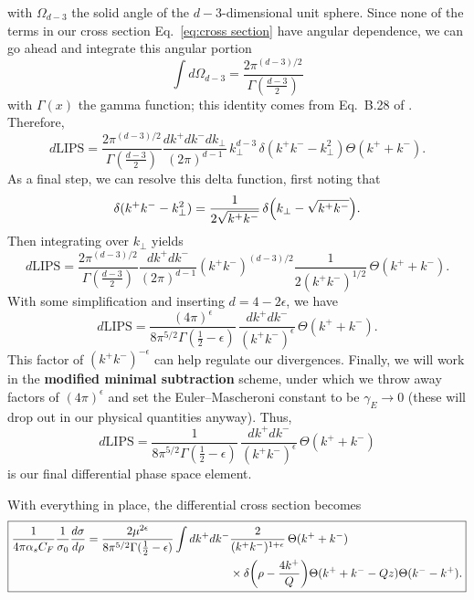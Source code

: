 \documentclass[11pt,twoside,reqno]{amsart}
\theoremstyle{plain}
\theoremstyle{remark}
\theoremstyle{definition}
\theoremstyle{remark}
\theoremstyle{definition}
\theoremstyle{definition}
\newcommand{\LIPS}{\mathrm{LIPS}}
\begin{document}
	with $\Omega_{d - 3}$ the solid angle of the $d - 3$-dimensional unit sphere. Since none of the terms in our cross section Eq.\ \ref{eq:cross section} have angular dependence, we can go ahead and integrate this angular portion
	\begin{equation}
		\int d\Omega_{d - 3} = \frac{2\pi^{(d - 3)/2}}{\Gamma(\frac{d - 3}{2})}
	\end{equation}
	with $\Gamma(x)$ the gamma function; this identity comes from Eq.\ B.28 of \cite{schwartz_quantum_2014}. Therefore,
	\begin{equation}
		d\LIPS = \frac{2\pi^{(d - 3)/2}}{\Gamma(\frac{d - 3}{2})} \frac{dk^+ dk^- dk_\perp}{(2 \pi)^{d - 1}}\,k_\perp^{d - 3}\, \delta(k^+ k^- - k_\perp^2) \Theta(k^+ + k^-).
	\end{equation}
	As a final step, we can resolve this delta function, first noting that
	\begin{equation}
		\delta(k^+ k^- - k_\perp^2) = \frac{1}{2\sqrt{k^+ k^-}}\,\delta\qty(k_\perp - \sqrt{k^+ k^-}).
	\end{equation}
	Then integrating over $k_\perp$ yields
	\begin{equation}
		d\LIPS = \frac{2\pi^{(d - 3)/2}}{\Gamma(\frac{d - 3}{2})} \frac{dk^+ dk^-}{(2 \pi)^{d - 1}} (k^+ k^-)^{(d - 3)/2}\frac{1}{2(k^+ k^-)^{1/2}}\,\Theta(k^+ + k^-).
	\end{equation}
	With some simplification and inserting $d = 4 - 2\epsilon$, we have
	\begin{equation}
		d\LIPS = \frac{(4\pi)^\epsilon}{8\pi^{5/2}\Gamma(\frac{1}{2} - \epsilon)}\,\frac{dk^+ dk^-}{(k^+ k^-)^\epsilon} \, \Theta(k^+ + k^-).
	\end{equation}
	This factor of $(k^+ k^-)^{-\epsilon}$ can help regulate our divergences. Finally, we will work in the \textbf{modified minimal subtraction} scheme, under which we throw away factors of $(4\pi)^\epsilon$ and set the Euler–Mascheroni constant to be $\gamma_E \to 0$ (these will drop out in our physical quantities anyway). Thus,
	\begin{equation}
		d\LIPS = \frac{1}{8\pi^{5/2}\Gamma(\frac{1}{2} - \epsilon)}\,\frac{dk^+ dk^-}{(k^+ k^-)^\epsilon} \, \Theta(k^+ + k^-)
	\end{equation}
	is our final differential phase space element.

	With everything in place, the differential cross section becomes
	\begin{equation}
	\boxed{
	\begin{aligned}
		\frac{1}{4\pi \alpha_s C_F}\frac{1}{\sigma_0} \frac{d\sigma}{d\rho} = \frac{2\mu^{2\epsilon}}{8\pi^{5/2}\Gamma(\frac{1}{2} - \epsilon)} \int dk^+ dk^- & \frac{2}{(k^+ k^-)^{1 + \epsilon}} \, \Theta(k^+ + k^-) \\
			&\times \delta\qty(\rho - \frac{4 k^+}{Q})\Theta(k^+ + k^- - Qz)\Theta(k^- - k^+).
	\end{aligned}
	}
	\end{equation}
\end{document}
